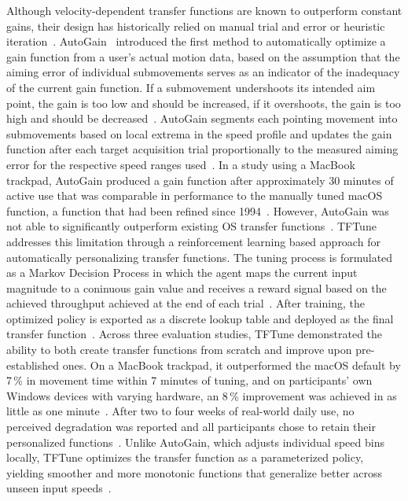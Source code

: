 \documentclass[12pt,a4paper]{report}
\begin{document}
        Although velocity-dependent transfer functions are known to outperform constant gains, their design has historically relied on manual trial and error or heuristic iteration~\cite{lee2020autogain}. AutoGain~\cite{lee2020autogain} introduced the first method to automatically optimize a gain function from a user's actual motion data, based on the assumption that the aiming error of individual submovements serves as an indicator of the inadequacy of the current gain function. If a submovement undershoots its intended aim point, the gain is too low and should be increased, if it overshoots, the gain is too high and should be decreased~\cite{lee2020autogain}. AutoGain segments each pointing movement into submovements based on local extrema in the speed profile and updates the gain function after each target acquisition trial proportionally to the measured aiming error for the respective speed ranges used~\cite{lee2020autogain}. In a study using a MacBook trackpad, AutoGain produced a gain function after approximately 30 minutes of active use that was comparable in performance to the manually tuned macOS function, a function that had been refined since 1994~\cite{lee2020autogain}. However, AutoGain was not able to significantly outperform existing OS transfer functions~\cite{eddy2026tftune}. TFTune addresses this limitation through a reinforcement learning based approach for automatically personalizing transfer functions. The tuning process is formulated as a Markov Decision Process in which the agent maps the current input magnitude to a coninuous gain value and receives a reward signal based on the achieved throughput achieved at the end of each trial~\cite{eddy2026tftune}. After training, the optimized policy is exported as a discrete lookup table and deployed as the final transfer function~\cite{eddy2026tftune}. Across three evaluation studies, TFTune demonstrated the ability to both create transfer functions from scratch and improve upon pre-established ones. On a MacBook trackpad, it outperformed the macOS default by 7\,\% in movement time within 7 minutes of tuning, and on participants' own Windows devices with varying hardware, an 8\,\% improvement was achieved in as little as one minute~\cite{eddy2026tftune}. After two to four weeks of real-world daily use, no perceived degradation was reported and all participants chose to retain their personalized functions~\cite{eddy2026tftune}. Unlike AutoGain, which adjusts individual speed bins locally, TFTune optimizes the transfer function as a parameterized policy, yielding smoother and more monotonic functions that generalize better across unseen input speeds~\cite{eddy2026tftune}.
\end{document}
